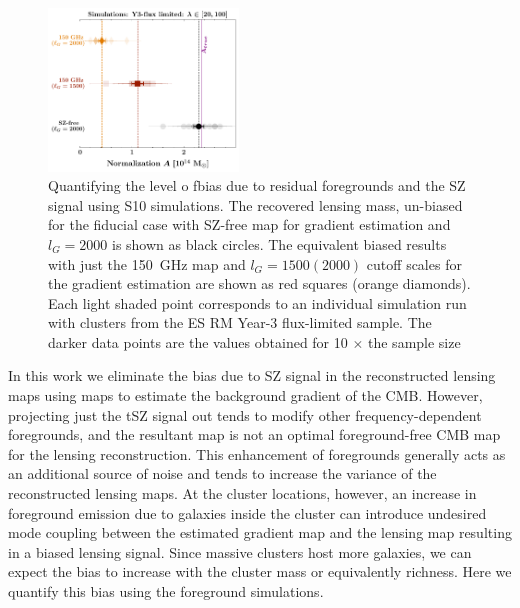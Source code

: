 \begin{figure}
\centering

\includegraphics[width=0.45\textwidth, keepaspectratio]{figs/tsz_bias_checks_sehgal_sims.pdf}
\caption{ Quantifying the level o fbias due to residual foregrounds and the SZ signal using S10 simulations. The recovered lensing mass, un-biased for the fiducial case with SZ-free map for gradient estimation and $l_{G} = 2000$ is shown as black circles. The equivalent biased results with just the 150\, GHz map and $l_{G} = 1500 (2000)$ cutoff scales for the gradient estimation are shown as red squares (orange diamonds). Each light shaded point corresponds to an individual simulation run with clusters from the ES RM Year-3 flux-limited sample. The darker data points are the values obtained for 10 $\times$ the sample size}
\label{fig_QE_sehgal_sims}
\end{figure}

In this work we eliminate the bias due to SZ signal in the reconstructed lensing maps using  maps to estimate the background gradient of the CMB. 
However, projecting just the tSZ signal out tends to modify other frequency-dependent foregrounds, and the resultant map is not an optimal foreground-free CMB map for the lensing reconstruction. 
This enhancement of foregrounds generally acts as an additional source of noise and tends to increase the variance of the reconstructed lensing maps. 
At the cluster locations, however, an increase in foreground emission due to galaxies inside the cluster can introduce undesired mode coupling between the estimated gradient map and the lensing map resulting in a biased lensing signal. 
Since massive clusters host more galaxies, we can expect the bias to increase with the cluster mass or equivalently richness. 
Here we quantify this bias using the \cite{sehgal10} foreground simulations.

